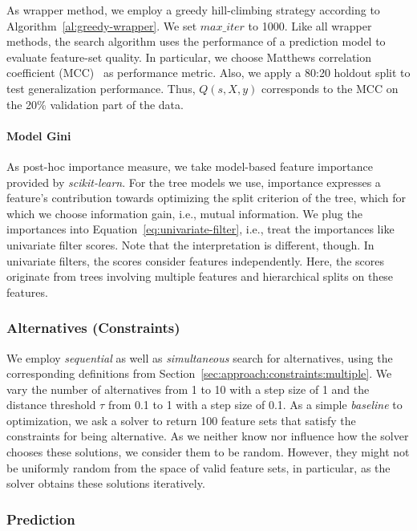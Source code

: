 \documentclass{article}
\theoremstyle{definition}
\begin{document}
As wrapper method, we employ a greedy hill-climbing strategy according to Algorithm~\ref{al:greedy-wrapper}.
We set $max\_iter$ to 1000.
Like all wrapper methods, the search algorithm uses the performance of a prediction model to evaluate feature-set quality.
In particular, we choose Matthews correlation coefficient (MCC)~\cite{matthews1975comparison} as performance metric.
Also, we apply a 80:20 holdout split to test generalization performance.
Thus, $Q(s,X,y)$ corresponds to the MCC on the 20\% validation part of the data.

\paragraph{Model Gini}

As post-hoc importance measure, we take model-based feature importance provided by \emph{scikit-learn}.
For the tree models we use, importance expresses a feature's contribution towards optimizing the split criterion of the tree, which for which we choose information gain, i.e., mutual information.
We plug the importances into Equation~\ref{eq:univariate-filter}, i.e., treat the importances like univariate filter scores.
Note that the interpretation is different, though.
In univariate filters, the scores consider features independently.
Here, the scores originate from trees involving multiple features and hierarchical splits on these features.

\subsubsection{Alternatives (Constraints)}

We employ \emph{sequential} as well as \emph{simultaneous} search for alternatives, using the corresponding definitions from Section~\ref{sec:approach:constraints:multiple}.
We vary the number of alternatives from 1 to 10 with a step size of 1 and the distance threshold $\tau$ from 0.1 to 1 with a step size of 0.1.
As a simple \emph{baseline} to optimization, we ask a solver to return 100 feature sets that satisfy the constraints for being alternative.
As we neither know nor influence how the solver chooses these solutions, we consider them to be random.
However, they might not be uniformly random from the space of valid feature sets, in particular, as the solver obtains these solutions iteratively.

\subsubsection{Prediction}
\end{document}
